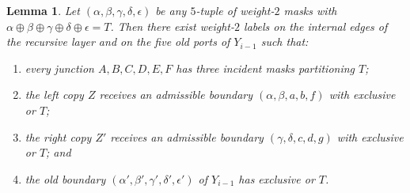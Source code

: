 \documentclass[11pt]{article}
\newtheorem{lemma}[theorem]{Lemma}
\begin{document}
\begin{lemma}\label{lem:layer}
Let $(\alpha,\beta,\gamma,\delta,\epsilon)$ be any $5$-tuple of weight-$2$ masks with
$\alpha \oplus \beta \oplus \gamma \oplus \delta \oplus \epsilon = T$. Then there exist
weight-$2$ labels on the internal edges of the recursive layer and on the five old ports
of $Y_{i-1}$ such that:
\begin{enumerate}
  \item every junction $A, B, C, D, E, F$ has three incident masks partitioning $T$;
  \item the left copy $Z$ receives an admissible boundary $(\alpha,\beta,a,b,f)$ with
        exclusive or $T$;
  \item the right copy $Z'$ receives an admissible boundary $(\gamma,\delta,c,d,g)$ with
        exclusive or $T$; and
  \item the old boundary $(\alpha',\beta',\gamma',\delta',\epsilon')$ of $Y_{i-1}$ has
        exclusive or $T$.
\end{enumerate}
\end{lemma}
\end{document}
